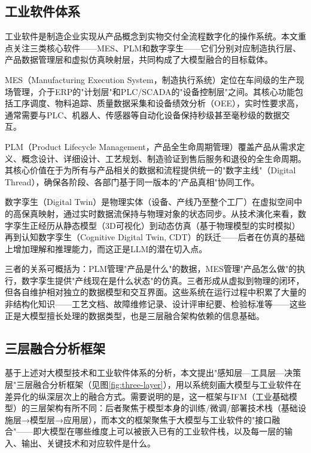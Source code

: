 \documentclass[12pt,a4paper]{ctexart}
\begin{document}
\subsection{工业软件体系}

工业软件是制造企业实现从产品概念到实物交付全流程数字化的操作系统。本文重点关注三类核心软件——MES、PLM和数字孪生——它们分别对应制造执行层、产品数据管理层和虚拟仿真映射层，共同构成了大模型融合的目标载体。

MES（Manufacturing Execution System，制造执行系统）定位在车间级的生产现场管理，介于ERP的"计划层"和PLC/SCADA的"设备控制层"之间。其核心功能包括工序调度、物料追踪、质量数据采集和设备绩效分析（OEE），实时性要求高，通常需要与PLC、机器人、传感器等自动化设备保持秒级甚至毫秒级的数据交互。

PLM（Product Lifecycle Management，产品全生命周期管理）覆盖产品从需求定义、概念设计、详细设计、工艺规划、制造验证到售后服务和退役的全生命周期。其核心价值在于为所有与产品相关的数据和流程提供统一的"数字主线"（Digital Thread），确保各阶段、各部门基于同一版本的"产品真相"协同工作。

数字孪生（Digital Twin）是物理实体（设备、产线乃至整个工厂）在虚拟空间中的高保真映射，通过实时数据流保持与物理对象的状态同步。从技术演化来看，数字孪生正经历从静态模型（3D可视化）到动态仿真（基于物理模型的实时模拟）再到认知数字孪生（Cognitive Digital Twin, CDT）的跃迁——后者在仿真的基础上增加理解和推理能力，而这正是LLM的潜在切入点。\cite{jiic2025cdtllm}

三者的关系可概括为：PLM管理"产品是什么"的数据，MES管理"产品怎么做"的执行，数字孪生提供"产线现在是什么状态"的仿真。三者形成从虚拟到物理的闭环，但各自维护相对独立的数据模型和交互界面。这些系统在运行过程中积累了大量的非结构化知识——工艺文档、故障维修记录、设计评审纪要、检验标准等——这些正是大模型擅长处理的数据类型，也是三层融合架构依赖的信息基础。

\subsection{三层融合分析框架}

基于上述对大模型技术和工业软件体系的分析，本文提出"感知层—工具层—决策层"三层融合分析框架（见图\ref{fig:three-layer}），用以系统刻画大模型与工业软件在差异化的纵深层次上的融合方式。需要说明的是，这一框架与IFM（工业基础模型）的三层架构\cite{jms2025ifm}有所不同：后者聚焦于模型本身的训练/微调/部署技术栈（基础设施层→模型层→应用层），而本文的框架聚焦于大模型与工业软件的"接口融合"——即大模型在哪些维度上可以被嵌入已有的工业软件栈，以及每一层的输入、输出、关键技术和对应软件是什么。
\end{document}
